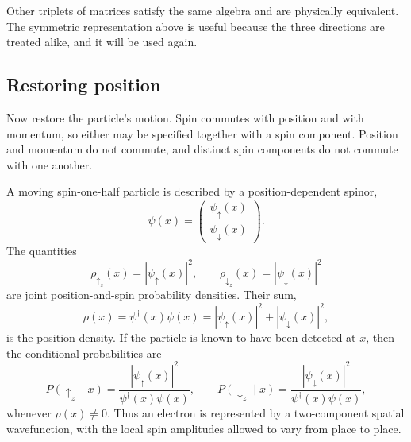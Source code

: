 \begin{classroomqa}
\end{classroomqa}

Other triplets of matrices satisfy the same algebra and are physically equivalent. The symmetric representation above is useful because the three directions are treated alike, and it will be used again.

\subsection{Restoring position}

Now restore the particle's motion. Spin commutes with position and with momentum, so either may be specified together with a spin component. Position and momentum do not commute, and distinct spin components do not commute with one another.

A moving spin-one-half particle is described by a position-dependent spinor,
\begin{equation}
\psi(x)=
\begin{pmatrix}
\psi_\uparrow(x)\\
\psi_\downarrow(x)
\end{pmatrix}.
\end{equation}
The quantities
\begin{equation}
\rho_{\uparrow_z}(x)=|\psi_\uparrow(x)|^2,
\qquad
\rho_{\downarrow_z}(x)=|\psi_\downarrow(x)|^2
\end{equation}
are joint position-and-spin probability densities. Their sum,
\begin{equation}
\rho(x)=\psi^\dagger(x)\psi(x)
=|\psi_\uparrow(x)|^2+|\psi_\downarrow(x)|^2,
\end{equation}
is the position density. If the particle is known to have been detected at \(x\), then the conditional probabilities are
\begin{equation}
P(\uparrow_z\mid x)
=
\frac{|\psi_\uparrow(x)|^2}{\psi^\dagger(x)\psi(x)},
\qquad
P(\downarrow_z\mid x)
=
\frac{|\psi_\downarrow(x)|^2}{\psi^\dagger(x)\psi(x)},
\end{equation}
whenever \(\rho(x)\neq0\). Thus an electron is represented by a two-component spatial wavefunction, with the local spin amplitudes allowed to vary from place to place.

